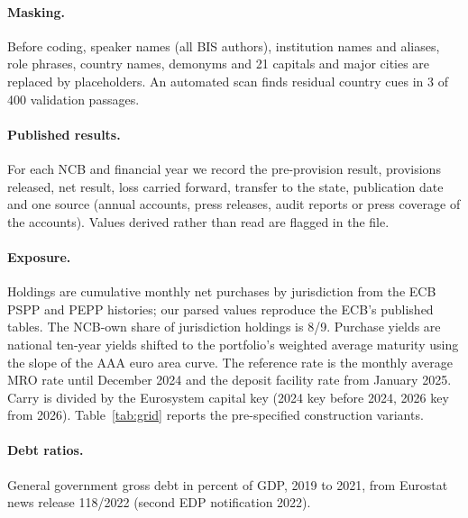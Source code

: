 \documentclass[11pt]{article}
\theoremstyle{plain}
\begin{document}
\paragraph{Masking.} Before coding, speaker names (all BIS authors), institution names and aliases, role phrases, country names, demonyms and 21 capitals and major cities are replaced by placeholders. An automated scan finds residual country cues in 3 of 400 validation passages.
\paragraph{Published results.} For each NCB and financial year we record the pre-provision result, provisions released, net result, loss carried forward, transfer to the state, publication date and one source (annual accounts, press releases, audit reports or press coverage of the accounts). Values derived rather than read are flagged in the file.
\paragraph{Exposure.} Holdings are cumulative monthly net purchases by jurisdiction from the ECB PSPP and PEPP histories; our parsed values reproduce the ECB's published tables. The NCB-own share of jurisdiction holdings is 8/9. Purchase yields are national ten-year yields shifted to the portfolio's weighted average maturity using the slope of the AAA euro area curve. The reference rate is the monthly average MRO rate until December 2024 and the deposit facility rate from January 2025. Carry is divided by the Eurosystem capital key (2024 key before 2024, 2026 key from 2026). Table~\ref{tab:grid} reports the pre-specified construction variants.
\paragraph{Debt ratios.} General government gross debt in percent of GDP, 2019 to 2021, from Eurostat news release 118/2022 (second EDP notification 2022).
\end{document}
